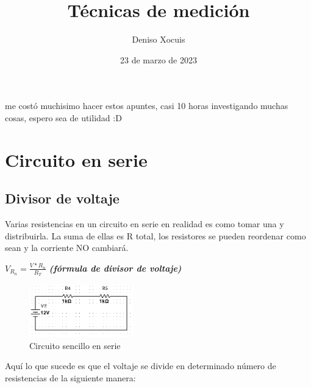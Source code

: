 \documentclass[a4paper,11pt]{article}
\title{\textbf{Técnicas de medición}}
\author{Deniso Xocuis}
\date{23 de marzo de 2023}
\begin{document}
\maketitle
\thispagestyle{empty}
\tableofcontents %
\noindent me costó muchisimo hacer estos apuntes, casi 10 horas investigando muchas cosas, espero sea de utilidad :D
\newpage
\setcounter{page}{1}
\pagestyle{headings}
\section{Circuito en serie}
\subsection{Divisor de voltaje}
\noindent Varias resistencias en un circuito en serie en realidad es como tomar una y distribuirla.  La suma de ellas es R total, los resistores se pueden reordenar como sean y la corriente NO cambiará. 
\begin{center}

    $V_{R_n} = \frac{V*R_n}{R_T}$ \textcolor[cmyk]{1,0,1,0}{\textbf{\textit{(fórmula de divisor de voltaje)}}}
    
\end{center}
\begin{figure}[H]
    \centering
     \includegraphics[width=0.4\textwidth]{images/circuito en serie.PNG}
     \caption{Circuito sencillo en serie}
     \label{fig:cs}
\end{figure}
\noindent Aquí lo que sucede es que el voltaje se divide en determinado número de resistencias de la siguiente manera:
\end{document}
